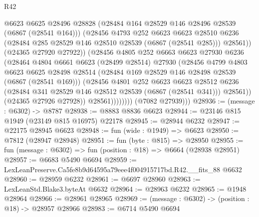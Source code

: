 \begin{lexlean}{R42}
\begin{coremodule}
{                          @6623
                          @6625
                          @28496
                          @28828
                          (@28484 @164 @28529 @146 @28496 @28539 (@6867 (@28541 @164)))
                          (@28456
                            @4793
                            @252
                            @6623
                            @6623
                            @28510
                            @6236
                            (@28484 @285 @28529 @146 @28510 @28539 (@6867 (@28541 @285)))
                            @28561))
                        (@24365 @27920 @27922))
                      (@28456
                        @4805
                        @252
                        @6663
                        @6623
                        @27930
                        @6236
                        (@28464
                          @4804
                          @6661
                          @6623
                          (@28499 @28514)
                          @27930
                          (@28456
                            @4799
                            @4803
                            @6623
                            @6625
                            @28498
                            @28514
                            (@28484 @169 @28529 @146 @28498 @28539 (@6867 (@28541 @169)))
                            (@28456
                              @4801
                              @252
                              @6623
                              @6623
                              @28512
                              @6236
                              (@28484 @341 @28529 @146 @28512 @28539 (@6867 (@28541 @341)))
                              @28561))
                          (@24365 @27926 @27928))
                        @28561))))))))
        (@7082 @27939)))
@28936 := (message : @6302) -> @8787
@28938 := @8883 @8836 @6623
@28944 := @23146 @815 @1949 (@23149 @815 @16975) @22178
@28945 := @28944 @6232
@28947 := @22175 @28945 @6623
@28948 := fun (wide : @1949) => @6623
@28950 := @7812 (@28947 @28948)
@28951 := fun (byte : @815) => @28950
@28955 := fun (message : @6302) => fun (position : @18) => @6664 (@28938 @28951)
@28957 := @6683 @5490 @6694
@28959 := LexLeanPreserve.Ca5fe8b9d64595a79eee4f004915717bd.R42.__fits_88 @6632
@28960 := @28959 @6232
@28961 := @6697 @28960
@28963 := LexLeanStd.Blake3.byteAt @6632
@28964 := @28963 @6232
@28965 := @1948 @28964
@28966 := @28961 @28965
@28969 := (message : @6302) -> (position : @18) -> @28957 @28966
@28983 := @6714
    @5490
    @6694
}
\end{coremodule}
\end{lexlean}
